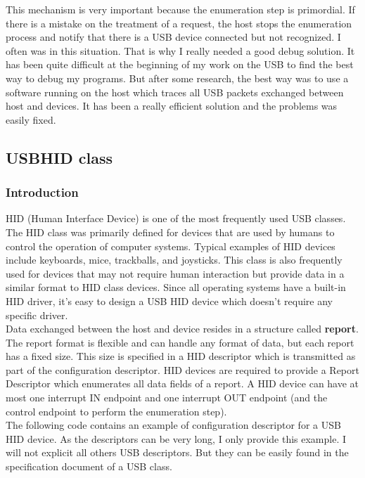 \documentclass[pdftex,10pt,a4paper]{report}
\begin{document}
This mechanism is very important because the enumeration step is primordial. If there is a mistake on the treatment of a request, the host stops the enumeration process and notify that there is a USB device connected but not recognized. I often was in this situation. That is why I really needed a good debug solution. It has been quite difficult at the beginning of my work on the USB to find the best way to debug my programs. But after some research, the best way was to use a software running on the host which traces all USB packets exchanged between host and devices. It has been a really efficient solution and the problems was easily fixed.


\subsection{USBHID class}
\subsubsection{Introduction}
HID (Human Interface Device) is one of the most frequently used USB classes. The HID class was primarily defined for devices that are used by humans to control the operation of computer systems. Typical examples of HID devices include keyboards, mice, trackballs, and joysticks. This class is also frequently used for devices that may not require human interaction but provide data in a similar format to HID class devices. Since all operating systems have a built-in HID driver, it's easy to design a USB HID device which doesn't require any specific driver. \\


Data exchanged between the host and device resides in a structure called \textbf{report}. The report format is flexible and can handle any format of data, but each report has a fixed size. This size is specified in a HID descriptor which is transmitted as part of the configuration descriptor.
HID devices are required to provide a Report Descriptor which enumerates all data fields of a report. A HID device can have at most one interrupt IN endpoint and one interrupt OUT endpoint (and the control endpoint to perform the enumeration step).
\\

The following code contains an example of configuration descriptor for a USB HID device. As the descriptors can be very long, I only provide this example. I will not explicit all others USB descriptors. But they can be easily found in the specification document of a USB class.
\end{document}
